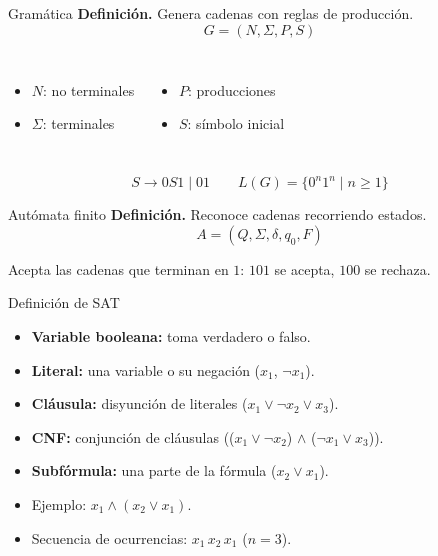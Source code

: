 \documentclass{beamer}
\newcommand{\azul}[1]{\textbf{\textcolor{blue!70!black}{#1}}}
\begin{document}
\begin{frame}{Gramática}
  \textbf{Definición.} Genera cadenas con reglas de producción.
  \[ G = (N, \Sigma, P, S) \]
  \begin{columns}
    \begin{itemize}
      \item $N$: no terminales
      \item $\Sigma$: terminales
    \end{itemize}
    \begin{itemize}
      \item $P$: producciones
      \item $S$: símbolo inicial
    \end{itemize}
  \end{columns}
  \pause
  \medskip
  \[ S \to 0S1 \mid 01 \qquad L(G) = \{0^n 1^n \mid n \ge 1\} \]
\end{frame}

\begin{frame}{Autómata finito}
  \textbf{Definición.} Reconoce cadenas recorriendo estados.
  \[ A = (Q, \Sigma, \delta, q_0, F) \]
  \pause
  \begin{center}
  \end{center}
  \pause
  Acepta las cadenas que terminan en $1$: \azul{$101$} se acepta, $100$ se rechaza.
\end{frame}

\begin{frame}{Definición de SAT}
  \begin{itemize}
    \item<1-> \textbf{Variable booleana:} toma verdadero o falso.
    \item<2-> \textbf{Literal:} una variable o su negación ($x_1$, $\neg x_1$).
    \item<3-> \textbf{Cláusula:} disyunción de literales ($x_1 \vee \neg x_2 \vee x_3$).
    \item<4-> \textbf{CNF:} conjunción de cláusulas (($x_1 \vee \neg x_2$) $\wedge$ ($\neg x_1 \vee x_3$)).
    \item<5-> \textbf{Subfórmula:} una parte de la fórmula ($x_2 \vee x_1$).
    \item<6-> Ejemplo: $x_1 \wedge (x_2 \vee x_1)$.
    \item<7-> Secuencia de ocurrencias: $x_1\,x_2\,x_1$ ($n=3$).
  \end{itemize}
\end{frame}
\end{document}
